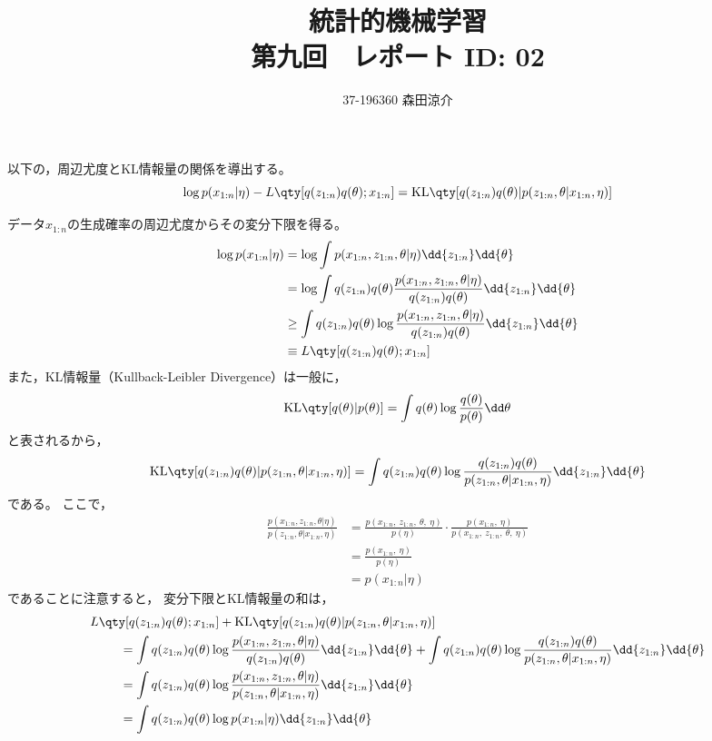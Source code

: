 \documentclass[dvipdfmx, fleqn]{jsarticle}
\title{
	統計的機械学習 \\
    第九回　レポート ID: 02
    }
\author{37-196360 \quad 森田涼介}
\begin{document}
\maketitle


以下の，周辺尤度とKL情報量の関係を導出する。
\begin{equation}
    \log{p(x_{1:n} | \eta)} - L\qty[q(z_{1:n}) q(\theta); x_{1:n}] = \mathrm{KL}\qty[q(z_{1:n}) q(\theta) | p(z_{1:n}, \theta | x_{1:n}, \eta)]
\end{equation}

データ\(x_{1:n}\)の生成確率の周辺尤度からその変分下限を得る。
\begin{align}
    \log{p(x_{1:n} | \eta)}
        & = \log{\int p(x_{1:n}, z_{1:n}, \theta | \eta) \dd{z_{1:n}} \dd{\theta}} \\
        & = \log{\int q(z_{1:n}) q(\theta) \frac{p(x_{1:n}, z_{1:n}, \theta | \eta)}{q(z_{1:n}) q(\theta)} \dd{z_{1:n}} \dd{\theta}} \\
        & \ge \int q(z_{1:n}) q(\theta) \log{\frac{p(x_{1:n}, z_{1:n}, \theta | \eta)}{q(z_{1:n}) q(\theta)}} \dd{z_{1:n}} \dd{\theta} \\
        & \equiv L\qty[q(z_{1:n}) q(\theta); x_{1:n}]
\end{align}
また，KL情報量（Kullback-Leibler Divergence）は一般に，
\begin{equation}
    \mathrm{KL}\qty[q(\theta) | p(\theta)] = \int q(\theta) \log{\frac{q(\theta)}{p(\theta)}} \dd\theta
\end{equation}
と表されるから，
\begin{equation}
    \mathrm{KL}\qty[q(z_{1:n}) q(\theta) | p(z_{1:n}, \theta | x_{1:n}, \eta)]
        = \int q(z_{1:n}) q(\theta) \log{\frac{q(z_{1:n}) q(\theta)}{p(z_{1:n}, \theta | x_{1:n}, \eta)}}  \dd{z_{1:n}} \dd{\theta}
\end{equation}
である。
ここで，
\begin{align}
    \frac{p(x_{1:n}, z_{1:n}, \theta | \eta)}{p(z_{1:n}, \theta | x_{1:n}, \eta)}
        & = \frac{p(x_{1:n},\ z_{1:n},\ \theta,\ \eta)}{p(\eta)} \cdot \frac{p(x_{1:n},\ \eta)}{p(x_{1:n},\ z_{1:n},\ \theta,\ \eta)} \\
        & = \frac{p(x_{1:n},\ \eta)}{p(\eta)} \\
        & = p(x_{1:n} | \eta)
\end{align}
であることに注意すると，
変分下限とKL情報量の和は，
\begin{align}
    & L\qty[q(z_{1:n}) q(\theta); x_{1:n}] + \mathrm{KL}\qty[q(z_{1:n}) q(\theta) | p(z_{1:n}, \theta | x_{1:n}, \eta)] \\
    & \ \qquad
        = \int q(z_{1:n}) q(\theta) \log{\frac{p(x_{1:n}, z_{1:n}, \theta | \eta)}{q(z_{1:n}) q(\theta)}} \dd{z_{1:n}} \dd{\theta} + \int q(z_{1:n}) q(\theta) \log{\frac{q(z_{1:n}) q(\theta)}{p(z_{1:n}, \theta | x_{1:n}, \eta)}}  \dd{z_{1:n}} \dd{\theta} \\
    & \ \qquad
        = \int q(z_{1:n}) q(\theta) \log{\frac{p(x_{1:n}, z_{1:n}, \theta | \eta)}{p(z_{1:n}, \theta | x_{1:n}, \eta)}} \dd{z_{1:n}} \dd{\theta} \\
    & \ \qquad
        = \int q(z_{1:n}) q(\theta) \log{p(x_{1:n} | \eta)} \dd{z_{1:n}} \dd{\theta}
\end{align}
\end{document}
